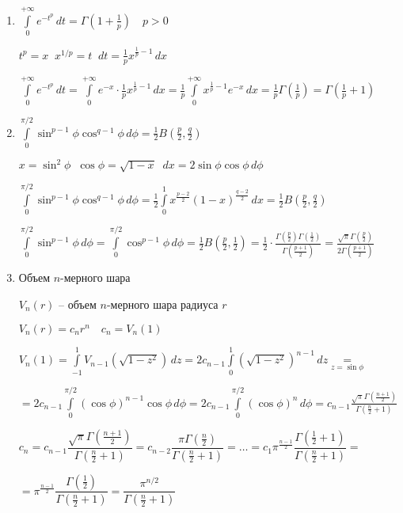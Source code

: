 
\begin{example}\thmslashn
	
	\begin{enumerate}
		\item 
		$\int\limits_{0}^{+\infty} e^{-t^p} \,dt = \Gamma \left(1 + \frac{1}{p} \right)\quad p > 0$
		
		$t^p = x\;\; x^{1/p} = t \;\; dt = \frac{1}{p}x^{\frac{1}{p}-1}\,dx$
		
		$\int\limits_{0}^{+\infty} e^{-t^p} \,dt =\int\limits_{0}^{+\infty} e^{-x}\cdot \frac{1}{p}x^{\frac{1}{p}-1}\,dx = \frac{1}{p} \int\limits_{0}^{+\infty} x^{\frac{1}{p}-1} e^{-x} \,dx = \frac{1}{p} \Gamma\left(\frac{1}{p}\right) = \Gamma\left(\frac{1}{p}+1\right)$
		
		\item
		$\int\limits_{0}^{\pi/2} \sin^{p-1} \phi \cos^{q-1}\phi \,d\phi = \frac{1}{2} B\left(\frac{p}{2}, \frac{q}{2}\right)$
		
		$x = \sin^2 \phi \;\; \cos \phi = \sqrt{1-x} \;\; dx = 2\sin \phi \cos\phi \,d\phi$
		
		$\int\limits_{0}^{\pi/2} \sin^{p-1} \phi \cos^{q-1}\phi \,d\phi =  \frac{1}{2} \int\limits_{0}^{1} x^{\frac{p-2}{2}} (1-x)^{\frac{q-2}{2}}\,dx = \frac{1}{2} B\left(\frac{p}{2}, \frac{q}{2}\right)$
		
		$\int\limits_{0}^{\pi/2} \sin^{p-1} \phi \,d\phi = \int\limits_{0}^{\pi/2} \cos^{p-1} \phi \,d\phi = \frac{1}{2} B\left(\frac{p}{2}, \frac{1}{2}\right) = \frac{1}{2} \cdot \frac{ \Gamma\left(\frac{p}{2}\right) \Gamma\left(\frac{1}{2}\right)} { \Gamma\left(\frac{p+1}{2}\right)} = \frac{\sqrt{\pi} \Gamma\left(\frac{p}{2}\right)} {2 \Gamma\left(\frac{p+1}{2}\right)}$
		
		\item
		Объем $n$-мерного шара
		
		$V_n(r)$ -- объем $n$-мерного шара радиуса $r$
		
		$V_n(r) = c_n r^n\quad c_n = V_n(1)$
		
		$V_n(1) = \int\limits_{-1}^{1} V_{n-1}(\sqrt{1 - z^2}) \,dz = 2c_{n-1}\int\limits_{0}^{1} (\sqrt{1-z^2})^{n-1}\,dz \underset{z = \sin \phi }=$
		
		$= 2c_{n-1} \int\limits_{0}^{\pi/2} (\cos \phi)^{n-1} \cos \phi\,d\phi = 2c_{n-1} \int\limits_{0}^{\pi/2} (\cos \phi)^{n}\,d\phi = c_{n-1}\frac{\sqrt{\pi} \Gamma\left( \frac{n+1}{2} \right)}{ \Gamma\left(\frac{n}{2}+1 \right)}$
		
		$c_n = c_{n-1}\dfrac{\sqrt{\pi} \Gamma\left( \frac{n+1}{2} \right)}{ \Gamma\left(\frac{n}{2}+1 \right)} = c_{n-2} \dfrac{\pi \Gamma\left( \frac{n}{2} \right)}{ \Gamma\left(\frac{n}{2}+1 \right)} = \ldots =c_1 \pi^{\frac{n-1}{2}} \dfrac{\Gamma \left( \frac{1}{2} + 1\right)}{\Gamma \left( \frac{n}{2} + 1\right)} =$
		
		$= \pi^{\frac{n-1}{2}} \dfrac{\Gamma \left( \frac{1}{2} \right)}{\Gamma \left( \frac{n}{2} + 1\right)} = \dfrac{\pi^{n/2}}{\Gamma \left( \frac{n}{2} + 1\right)}$
		
	\end{enumerate}

\end{example}